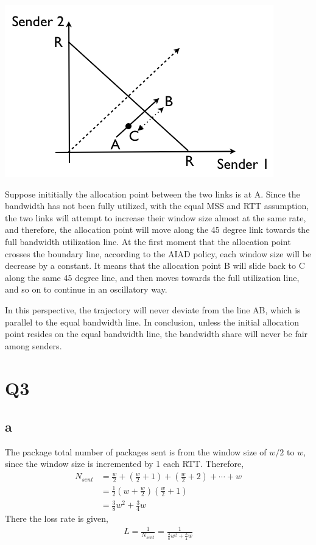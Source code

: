 \documentclass[a4paper, 11pt]{article}
\begin{document}
\includegraphics[scale=0.5]{2001.png}

Suppose inititially the allocation point between the two links is at A. Since
the bandwidth has not been fully utilized, with the equal MSS and RTT assumption,
the two links will attempt to increase their window size almost at the same
rate, and therefore, the allocation point will move along the 45 degree link
towards the full bandwidth utilization line. At the first moment that the
allocation point crosses the boundary line, according to the AIAD policy, each
window size will be decrease by a constant. It means that the allocation point B
will slide back to C along the same 45 degree line, and then moves towards the
full utilization line, and so on to continue in an oscillatory way.

In this perspective, the trajectory will never deviate from the line AB, which
is parallel to the equal bandwidth line. In conclusion, unless the initial
allocation point resides on the equal bandwidth line, the bandwidth share will
never be fair among senders.

\pagebreak
\section{Q3}
\subsection{a}
The package total number of packages sent is from the window size of $w/2$ to
$w$, since the window size is incremented by 1 each RTT. Therefore, 
\begin{align}
	N_{sent} &= \frac{w}{2} + \left(\frac{w}{2} + 1 \right) 
		+ \left(\frac{w}{2} + 2\right) + \cdots + w \\
			&= \frac{1}{2}\left(w + \frac{w}{2}\right)
						\left(\frac{w}{2} + 1 \right) \\
			&= \frac{3}{8} w^2 + \frac{3}{4}w
\end{align}
There the loss rate is given,
\begin{align}
	L = \frac{1}{N_{sent}} = \frac{1}{\frac{3}{8} w^2 + \frac{3}{4}w}
\end{align}
\end{document}
